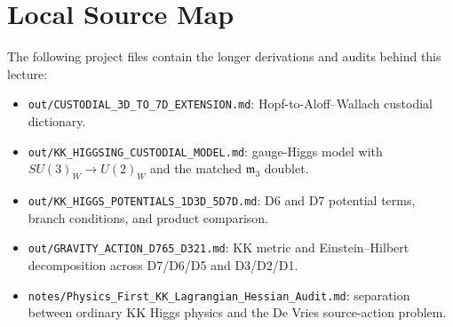 \documentclass[11pt]{article}
\newcommand{\mthree}{\mathfrak m_3}
\begin{document}
\section{Local Source Map}

The following project files contain the longer derivations and audits behind
this lecture:

\begin{itemize}[leftmargin=2em]
  \item \texttt{out/CUSTODIAL\_3D\_TO\_7D\_EXTENSION.md}: Hopf-to-Aloff--Wallach
  custodial dictionary.
  \item \texttt{out/KK\_HIGGSING\_CUSTODIAL\_MODEL.md}: gauge-Higgs model with
  \(SU(3)_W\to U(2)_W\) and the matched \(\mthree\) doublet.
  \item \texttt{out/KK\_HIGGS\_POTENTIALS\_1D3D\_5D7D.md}: D6 and D7 potential
  terms, branch conditions, and product comparison.
  \item \texttt{out/GRAVITY\_ACTION\_D765\_D321.md}: KK metric and
  Einstein--Hilbert decomposition across D7/D6/D5 and D3/D2/D1.
  \item \texttt{notes/Physics\_First\_KK\_Lagrangian\_Hessian\_Audit.md}:
  separation between ordinary KK Higgs physics and the De Vries
  source-action problem.
\end{itemize}
\end{document}
